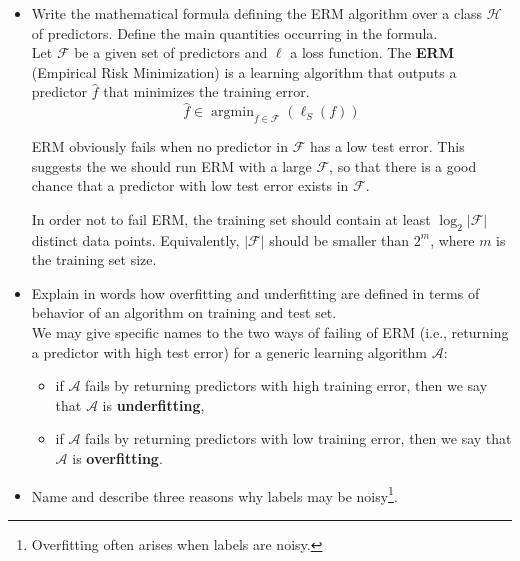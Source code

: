 \begin{itemize}
    \item Write the mathematical formula defining the ERM algorithm over a class $\mathcal{H}$ of predictors.
Define the main quantities occurring in the formula.\\
         
        Let $\mathcal{F}$ be a given set of predictors and $\ell$ a loss function.  
        The \textbf{ERM} (Empirical Risk Minimization) is a learning algorithm that outputs a predictor $\hat{f}$ that minimizes the training error.\\
        $$\hat{f} \in \mathop{argmin}_{f \in \mathcal{F}} \left( \ell_{S}(f) \right)$$

        ERM obviously fails when no predictor in $\mathcal{F}$  has a low test error.
        This suggests the we should run ERM with a large $\mathcal{F}$, so that there is a good chance that a predictor with low test error exists in $\mathcal{F}$.

        In order not to fail ERM, the training set should contain at least $\log_{2}|\mathcal{F}|$ distinct data points. Equivalently, $|\mathcal{F}|$ should be smaller than $2^{m}$, where $m$ is the training set size.\\

    \item Explain in words how overfitting and underfitting are defined in terms of behavior of an algorithm on training and test set.\\

        We may give specific names to the two ways of failing of ERM (i.e., returning a predictor with high test error) for a generic learning algorithm $\mathcal{A}$: 
            \begin{itemize}
                \item if $\mathcal{A}$ fails by returning predictors with high training error, then we say that $\mathcal{A}$ is \textbf{underfitting},
                \item  if $\mathcal{A}$ fails by returning predictors with low training error, then we say that $\mathcal{A}$ is \textbf{overfitting}.
            \end{itemize}
    
    \item  Name and describe three reasons why labels may be noisy\footnote{Overfitting often arises when labels are noisy.}.\\


\end{itemize}
